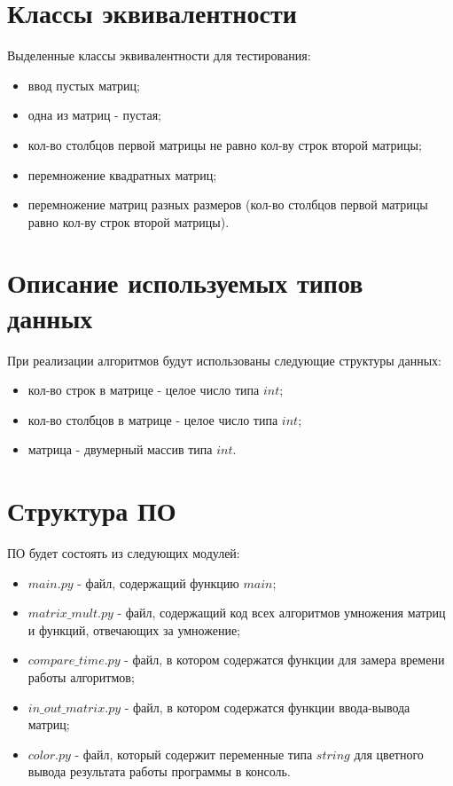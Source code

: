 \documentclass[a4paper,14pt, unknownkeysallowed]{extreport}
\begin{document}
\section{Классы эквивалентности}

Выделенные классы эквивалентности для тестирования:

\begin{itemize}
	\item ввод пустых матриц;
	\item одна из матриц - пустая;
	\item кол-во столбцов первой матрицы не равно кол-ву строк второй матрицы;
	\item перемножение квадратных матриц;
	\item перемножение матриц разных размеров (кол-во столбцов первой матрицы равно кол-ву строк второй матрицы).
\end{itemize}

\clearpage

\section{Описание используемых типов данных}

При реализации алгоритмов будут использованы следующие структуры данных:

\begin{itemize}
	\item кол-во строк в матрице - целое число типа $int$;
	\item кол-во столбцов в матрице - целое число типа $int$;
	\item матрица - двумерный массив типа $int$.
\end{itemize}

\section{Структура ПО}

ПО будет состоять из следующих модулей:

\begin{itemize}
	\item $main.py$ - файл, содержащий функцию $main$;
    \item $matrix\_mult.py$ - файл, содержащий код всех алгоритмов умножения матриц и функций, отвечающих за умножение;
    \item $compare\_time.py$ - файл, в котором содержатся функции для замера времени работы алгоритмов;
    \item $in\_out\_matrix.py$ - файл, в котором содержатся функции ввода-вывода матриц;
    \item $color.py$ - файл, который содержит переменные типа $string$ для цветного вывода результата работы программы в консоль.
\end{itemize}
\end{document}
